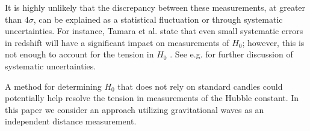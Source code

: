 It is highly unlikely that the discrepancy between these measurements, at greater than $4\sigma$, can be explained as a statistical fluctuation or through systematic uncertainties.
For instance, Tamara et al. state that even small systematic errors in redshift will have a significant impact on measurements of $H_0$; however, this is not enough to account for the tension in $H_0$ \cite{Davis_2019}.
See e.g. \cite{Efstathiou_2021,Calabrese_2008} for further discussion of systematic uncertainties.

A method for determining $H_0$ that does not rely on standard candles could potentially help resolve the tension in measurements of the Hubble constant.
In this paper we consider an approach utilizing gravitational waves as an independent distance measurement.




